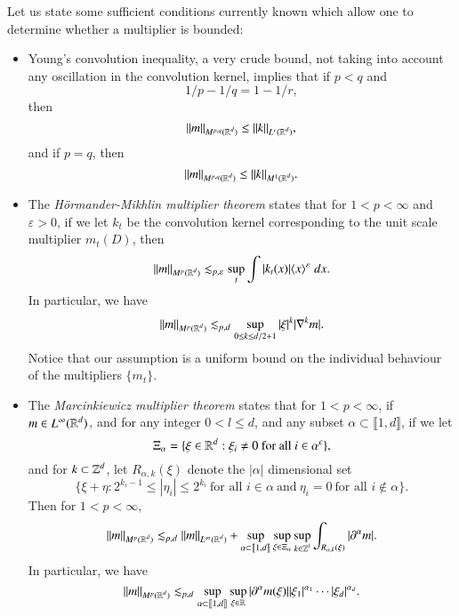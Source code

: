 Let us state some sufficient conditions currently known which allow one to determine whether a multiplier is bounded:
%
\begin{itemize}
    \item Young's convolution inequality, a very crude bound, not taking into account any oscillation in the convolution kernel, implies that if $p < q$ and
    \[ 1/p - 1/q = 1 - 1/r, \]
    then
    \[ \| m \|_{M^{p,q}(\operatorname{\mathbb{R}}^d)} \leq \| k \|_{L^r(\operatorname{\mathbb{R}}^d)}, \]
    and if $p = q$, then
    \[ \| m \|_{M^{p,q}(\operatorname{\mathbb{R}}^d)} \leq \| k \|_{M^1(\operatorname{\mathbb{R}}^d)}. \]
%
% 
%
%
%
%

    \item The \emph{H\"{o}rmander-Mikhlin multiplier theorem} states that for $1 < p < \infty$ and $\varepsilon > 0$, if we let $k_t$ be the convolution kernel corresponding to the unit scale multiplier $m_t(D)$, then
    \[ \| m \|_{M^p(\operatorname{\mathbb{R}}^d)} \lesssim_{p,\varepsilon} \sup_t \int |k_t(x)| \langle x \rangle^\varepsilon\; dx. \]
    In particular, we have
    \[ \| m \|_{M^p(\operatorname{\mathbb{R}}^d)} \lesssim_{p,d} \sup_{0 \leq k \leq d/2 + 1} |\xi|^k |\nabla^k m|. \]
    Notice that our assumption is a uniform bound on the individual behaviour of the multipliers $\{ m_t \}$.

    \item The \emph{Marcinkiewicz multiplier theorem} states that for $1 < p < \infty$, if $m \in L^\infty(\operatorname{\mathbb{R}}^d)$, and for any integer $0 < l \leq d$, and any subset $\alpha \subset \llbracket 1,d \rrbracket$, if we let
    \[ \Xi_\alpha = \{ \xi \in \operatorname{\mathbb{R}}^d: \xi_i \neq 0\ \text{for all $i \in \alpha^c$} \}, \]
    and for $k \subset \operatorname{\mathbb{Z}}^d$, let $R_{\alpha,k}(\xi)$ denote the $|\alpha|$ dimensional set
    \[ \{ \xi + \eta: 2^{k_i-1} \leq |\eta_i| \leq 2^{k_i}\ \text{for all $i \in \alpha$}\ \text{and}\ \eta_i = 0\ \text{for all $i \not \in \alpha$} \}. \]
    Then for $1 < p < \infty$,
    \[ \| m \|_{M^p(\operatorname{\mathbb{R}}^d)} \lesssim_{p,d} \| m \|_{L^\infty(\operatorname{\mathbb{R}}^d)} + \sup_{\alpha \subset \llbracket 1,d \rrbracket} \sup_{\xi \in \Xi_\alpha} \sup_{k \in \operatorname{\mathbb{Z}}^l} \int_{R_{\alpha,k}(\xi)} |\partial^\alpha m|. \]
    In particular, we have
    \[ \| m \|_{M^p(\operatorname{\mathbb{R}}^d)} \lesssim_{p,d} \sup_{\alpha \subset \llbracket 1,d \rrbracket} \sup_{\xi \in \operatorname{\mathbb{R}}} |\partial^\alpha m(\xi)| |\xi_1|^{\alpha_1} \cdots |\xi_d|^{\alpha_d}. \]
\end{itemize}
